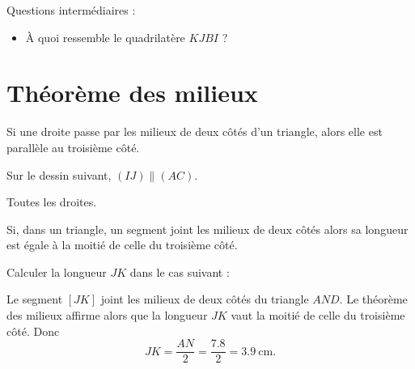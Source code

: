 



\vspace{2cm}

Questions intermédiaires : 
\begin{itemize}
    \item  À quoi ressemble le quadrilatère \( KJBI\) ?
\end{itemize}

\section{Théorème des milieux}

\begin{theorem}
    Si une droite passe par les milieux de deux côtés d'un triangle, alors elle est parallèle au troisième côté.
\end{theorem}

Sur le dessin suivant, \( (IJ)\parallel (AC)\).
\begin{center}
   
\end{center}

Toutes les droites.
\begin{center}
   
\end{center}

\begin{theorem}
Si, dans un triangle, un segment joint les milieux de deux côtés alors sa longueur est égale à la moitié de celle du troisième côté.
\end{theorem}

\begin{example}
    Calculer la longueur \( JK\) dans le cas suivant :
\begin{center}
   
\end{center}
\end{example}

Le segment \( [JK]\) joint les milieux de deux côtés du triangle \( AND\). Le théorème des milieux affirme alors que la longueur \( JK\) vaut la moitié de celle du troisième côté. Donc
\begin{equation}
    JK=\frac{ AN }{2}=\frac{ 7.8 }{ 2 }=\SI{3.9}{\centi\meter}.
\end{equation}
